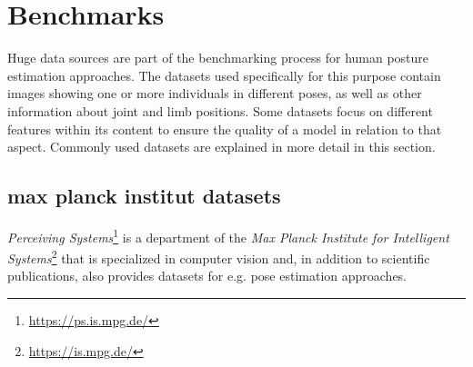 \section{Benchmarks}
Huge data sources are part of the benchmarking process for human posture estimation approaches. The datasets used specifically for this purpose contain images showing one or more individuals in different poses, as well as other information about joint and limb positions. Some datasets focus on different features within its content to ensure the quality of a model in relation to that aspect. Commonly used datasets are explained in more detail in this section.

\subsection{max planck institut datasets}
\emph{Perceiving Systems}\footnote{\url{https://ps.is.mpg.de/}} is a department of the \emph{Max Planck Institute for Intelligent Systems}\footnote{\url{https://is.mpg.de/}} that is specialized in computer vision and, in addition to scientific publications, also provides datasets for e.g. pose estimation approaches.

\cite{mpii}